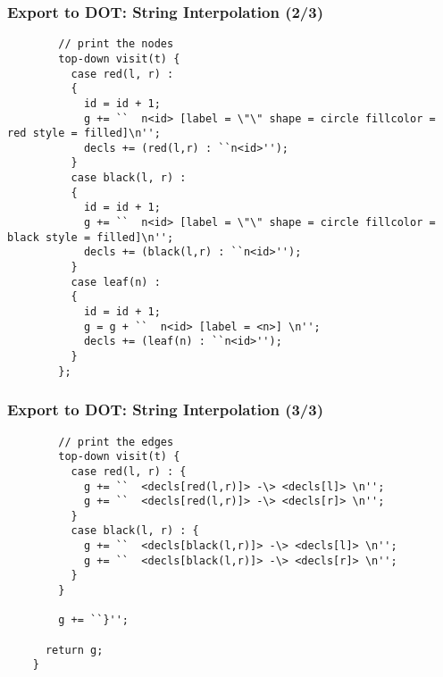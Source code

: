 \documentclass{beamer}
\begin{document}
\begin{frame}[fragile]
  \frametitle{Export to DOT: String Interpolation (2/3)}

  \begin{small}
    \begin{verbatim}
        // print the nodes
        top-down visit(t) {
          case red(l, r) :
          {
            id = id + 1;
            g += ``  n<id> [label = \"\" shape = circle fillcolor = red style = filled]\n'';
            decls += (red(l,r) : ``n<id>'');
          }
          case black(l, r) :
          {
            id = id + 1;
            g += ``  n<id> [label = \"\" shape = circle fillcolor = black style = filled]\n'';
            decls += (black(l,r) : ``n<id>'');
          }
          case leaf(n) :
          {
            id = id + 1;
            g = g + ``  n<id> [label = <n>] \n'';
            decls += (leaf(n) : ``n<id>'');
          }
        };
\end{verbatim}
  \end{small}
\end{frame}

\begin{frame}[fragile]
  \frametitle{Export to DOT: String Interpolation (3/3)}
  \begin{small}
    \begin{verbatim}
        // print the edges
        top-down visit(t) {
          case red(l, r) : {
            g += ``  <decls[red(l,r)]> -\> <decls[l]> \n'';
            g += ``  <decls[red(l,r)]> -\> <decls[r]> \n'';
          }
          case black(l, r) : {
            g += ``  <decls[black(l,r)]> -\> <decls[l]> \n'';
            g += ``  <decls[black(l,r)]> -\> <decls[r]> \n'';
          }
        }

        g += ``}'';

      return g;
    }
  \end{verbatim}  
  \end{small}  
\end{frame}
\end{document}
